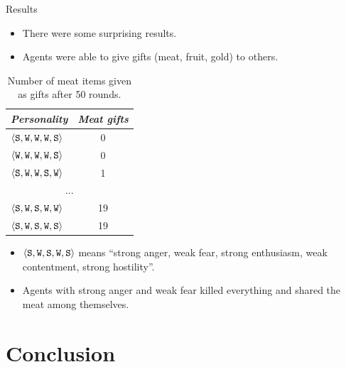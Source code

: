             \begin{frame}{Results}
               \begin{itemize}
                  \item There were some surprising results.
                  \item Agents were able to give gifts (meat, fruit, gold) to others.
               \end{itemize}
               
               \begin{table}
                  \centering
                  \begin{tabular}{ l | c }
                     \emph{Personality} & \emph{Meat gifts} \\
                     \hline
                     
                     $\langle \mathtt{S},\mathtt{W}, \mathtt{W}, \mathtt{W}, \mathtt{S} \rangle$ & 0\\
                     $\langle \mathtt{W},\mathtt{W}, \mathtt{W}, \mathtt{W}, \mathtt{S} \rangle$ & 0\\
                     $\langle \mathtt{S},\mathtt{W}, \mathtt{W}, \mathtt{S}, \mathtt{W} \rangle$ & 1\\
                     \multicolumn{2}{c}{$\dots$}\\
                     $\langle \mathtt{S},\mathtt{W}, \mathtt{S}, \mathtt{W}, \mathtt{W} \rangle$ & 19\\
                     $\langle \mathtt{S},\mathtt{W}, \mathtt{S}, \mathtt{W}, \mathtt{S} \rangle$ & 19\\
                     \hline
                  \end{tabular}
                  \caption{Number of meat items given as gifts after 50 rounds.}
                  \label{tab:numWumpuses}
               \end{table}
               \begin{itemize}
                  \item $\langle \mathtt{S},\mathtt{W}, \mathtt{S}, \mathtt{W}, \mathtt{S} \rangle$ means ``strong anger, weak fear, strong enthusiasm, weak contentment, strong hostility''.
                  \item Agents with strong anger and weak fear killed everything and shared the meat among themselves.
               \end{itemize}
            \end{frame}
            
            \section{Conclusion}
            

